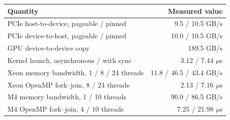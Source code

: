 \begin{tabular}{@{}lr@{}}
\toprule
Quantity & Measured value \\
\midrule
PCIe host-to-device, pageable / pinned & 9.5 / 10.5 GB/s \\
PCIe device-to-host, pageable / pinned & 10.0 / 10.5 GB/s \\
GPU device-to-device copy & 189.5 GB/s \\
Kernel launch, asynchronous / with sync & 3.12 / 7.44 $\mu$s \\
Xeon memory bandwidth, 1 / 8 / 24 threads & 11.8 / 46.5 / 43.4 GB/s \\
Xeon OpenMP fork--join, 8 / 24 threads & 2.13 / 7.16 $\mu$s \\
M4 memory bandwidth, 1 / 10 threads & 90.0 / 86.5 GB/s \\
M4 OpenMP fork--join, 4 / 10 threads & 7.25 / 21.98 $\mu$s \\
\bottomrule
\end{tabular}
